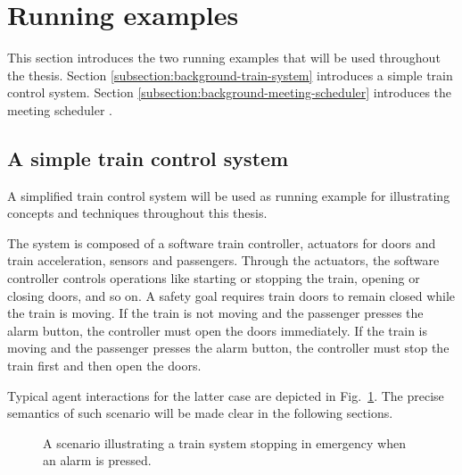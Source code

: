 \section{Running examples\label{section:background-running-examples}}

This section introduces the two running examples that will be used throughout the thesis. Section \ref{subsection:background-train-system} introduces a simple train control system. Section \ref{subsection:background-meeting-scheduler} introduces the meeting scheduler \cite{Feather:1997}.

\subsection{A simple train control system\label{subsection:background-train-system}}

A simplified train control system will be used as running example for illustrating concepts and techniques throughout this thesis. 

The system is composed of a software train controller, actuators for doors and train acceleration, sensors and passengers. Through the actuators, the software controller controls operations like starting or stopping the train, opening or closing doors, and so on. A safety goal requires train doors to remain closed while the train is moving. If the train is not moving and the passenger presses the alarm button, the controller must open the doors immediately. If the train is moving and the passenger presses the alarm button, the controller must stop the train first and then open the doors. 

Typical agent interactions for the latter case are depicted in Fig.~\ref{image:train-scenario-all-agents}. The precise semantics of such scenario will be made clear in the following sections.

\begin{figure}[H]\centering
{}
\caption{A scenario illustrating a train system stopping in emergency when an alarm is pressed.\label{image:train-scenario-all-agents}}
\end{figure}

